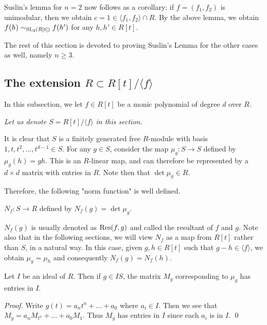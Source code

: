 Suslin's lemma for $n=2$ now follows as a corollary: if $f=(f_1, f_2)$ is unimodular, then we obtain $c = 1 \in \langle f_1, f_2 \rangle \cap R$. By the above lemma, we obtain $f(h) \sim_{\text{SL}_2(R[t])} f(h')$ for any $h,h' \in R[t]$.

The rest of this section is devoted to proving Suslin's Lemma for the other cases as well, namely $n \geq 3$.

\subsection{The extension $R \subset R[t]/\langle f \rangle$}
\label{subsec:theextension}

In this subsection, we let $f \in R[t]$ be a monic polynomial of degree $d$ over $R$.

\emph{Let us denote $S = R[t]/\langle f \rangle$ in this section.}

It is clear that $S$ is a finitely generated free $R$-module with basis $1, t, t^2, ..., t^{d-1} \in S$.
For any $g \in S$, consider the map $\mu_g: S \rightarrow S$ defined by $\mu_g(h) = gh$.
This is an $R$-linear map, and can therefore be represented by a $d \times d$ matrix with entries in $R$.
Note then that $\det \mu_g \in R$.

Therefore, the following "norm function" is well defined.

\begin{definition}\label{def:norm}
  $N_f: S \rightarrow R$ defined by $N_f(g) = \det \mu_g$.
\end{definition}

\begin{remark}
  $N_f(g)$ is usually denoted as $\text{Res}(f,g)$ and called the resultant of $f$ and $g$.
  Note also that in the following sections, we will view $N_f$ as a map from $R[t]$ rather than $S$, in a natural way.
  In this case, given $g,h\in R[t]$ such that $g - h \in \langle f \rangle$, we obtain $\mu_g = \mu_h$ and consequently $N_f(g) = N_f(h)$.
\end{remark}

\begin{proposition}
\label{prop:matrixentries}
  Let $I$ be an ideal of $R$.
  Then if $g \in IS$, the matrix $M_g$ corresponding to $\mu_g$ has entries in $I$.
\end{proposition}
\begin{proof}
  Write $g(t) = a_n t^n + \dots + a_0$ where $a_i \in I$.
  Then we see that $M_g = a_n M_{t^n} + \dots + a_0 M_1$.
  Thus $M_g$ has entries in $I$ since each $a_i$ is in $I$.
  \qed
\end{proof}

